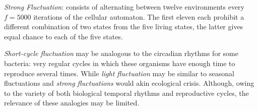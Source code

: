 \noindent \emph{Strong Fluctuation}: consists of alternating between twelve environments every $f=5000$ iterations of the cellular automaton. The first eleven each prohibit a different combination of two states from the five living states, the latter gives equal chance to each of the five states.


\emph{Short-cycle fluctuation} may be analogous to the circadian rhythms for some bacteria: very regular cycles in which these organisms have enough time to reproduce several times. While \emph{light fluctuation} may be similar to seasonal fluctuations and \emph{strong fluctuations} would akin ecological crisis. Although, owing to the variety of both biological temporal rhythms and reproductive cycles, the relevance of these analogies may be limited. 




